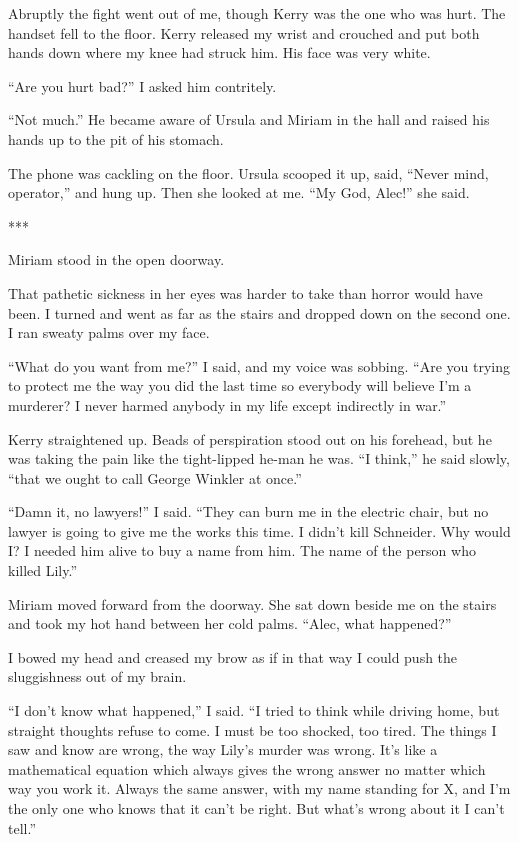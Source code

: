 {Abruptly the fight went out of me, though Kerry was the one who was hurt. The handset fell to the floor. Kerry released my wrist and crouched and put both hands down where my knee had struck him. His face was very white.

“Are you hurt bad?” I asked him contritely.

“Not much.” He became aware of Ursula and Miriam in the hall and raised his hands up to the pit of his stomach.

The phone was cackling on the floor. Ursula scooped it up, said, “Never mind, operator,” and hung up. Then she looked at me. “My God, Alec!” she said.

***

Miriam stood in the open doorway.

That pathetic sickness in her eyes was harder to take than horror would have been. I turned and went as far as the stairs and dropped down on the second one. I ran sweaty palms over my face.

“What do you want from me?” I said, and my voice was sobbing. “Are you trying to protect me the way you did the last time so everybody will believe I’m a murderer? I never harmed anybody in my life except indirectly in war.”

Kerry straightened up. Beads of perspiration stood out on his forehead, but he was taking the pain like the tight-lipped he-man he was. “I think,” he said slowly, “that we ought to call George Winkler at once.”

“Damn it, no lawyers!” I said. “They can burn me in the electric chair, but no lawyer is going to give me the works this time. I didn’t kill Schneider. Why would I? I needed him alive to buy a name from him. The name of the person who killed Lily.”

Miriam moved forward from the doorway. She sat down beside me on the stairs and took my hot hand between her cold palms. “Alec, what happened?”

I bowed my head and creased my brow as if in that way I could push the sluggishness out of my brain.

“I don’t know what happened,” I said. “I tried to think while driving home, but straight thoughts refuse to come. I must be too shocked, too tired. The things I saw and know are wrong, the way Lily’s murder was wrong. It’s like a mathematical equation which always gives the wrong answer no matter which way you work it. Always the same answer, with my name standing for X, and I’m the only one who knows that it can’t be right. But what’s wrong about it I can’t tell.”

}
